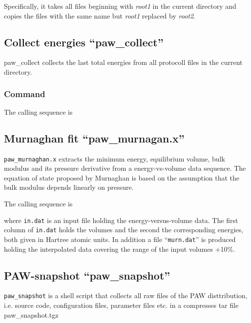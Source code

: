 \documentclass[final,12pt]{article}
\begin{document}
{{{Specifically, it takes all files beginning with {\it root1} in the
current directory and copies the files with the same name but {\it
root1} replaced by {\it root2}.

\subsection{Collect energies ``paw\_collect''}
paw\_collect collects the last total energies from all protocoll files
in the current directory.

\subsubsection{Command}
The calling sequence is

\bigskip{}


\subsection{Murnaghan fit ``paw\_murnagan.x''}
{\tt paw\_murnaghan.x} extracts the minimum energy, equilibrium
volume, bulk modulus and its pressure derivative from a
energy-vs-volume data sequence. The equation of state proposed by
Murnaghan\cite{murnaghan44_pnas30_244} is based on the assumption that
the bulk modulus depends linearly on pressure.

The calling sequence is

\bigskip{}\bigskip

where {\tt in.dat} is an input file holding the energy-versus-volume
data.  The first column of {\tt in.dat} holds the volumes and the
second the corresponding energies, both given in Hartree atomic
units. In addition a file ``{\tt murn.dat}'' is produced holding the
interpolated data covering the range of the input volumes +10\%.

\subsection{PAW-snapshot ``paw\_snapshot''}
{\tt paw\_snapshot} is a shell script that collects all raw files of
the PAW disttribution, i.e. source code, configuration files,
parameter files etc. in a compresses tar file paw\_snapshot.tgz

}}}
\end{document}
